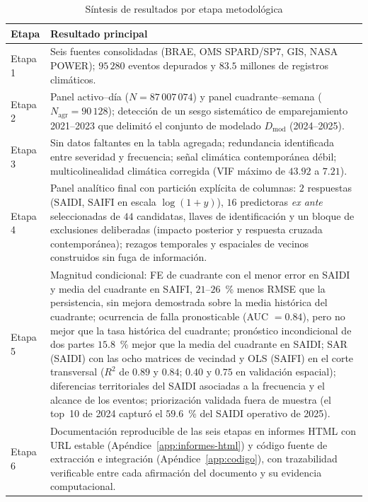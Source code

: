 \begin{table}[!htbp]
\centering
\small
\caption{Síntesis de resultados por etapa metodológica}
\label{tab:sintesis_etapas}
\begin{tabular}{p{} p{}}
\toprule
\textbf{Etapa} & \textbf{Resultado principal} \\
\midrule
Etapa 1 & Seis fuentes consolidadas (BRAE, OMS SPARD/SP7, GIS, NASA POWER); $95\,280$ eventos depurados y $83{.}5$ millones de registros climáticos. \\
Etapa 2 & Panel activo--día ($N=87\,007\,074$) y panel cuadrante--semana ($N_{\mathrm{agr}}=90\,128$); detección de un sesgo sistemático de emparejamiento 2021--2023 que delimitó el conjunto de modelado $D_{\mathrm{mod}}$ (2024--2025). \\
Etapa 3 & Sin datos faltantes en la tabla agregada; redundancia identificada entre severidad y frecuencia; señal climática contemporánea débil; multicolinealidad climática corregida (VIF máximo de $43{.}92$ a $7{.}21$). \\
Etapa 4 & Panel analítico final con partición explícita de columnas: $2$ respuestas ($\mathrm{SAIDI}$, $\mathrm{SAIFI}$ en escala $\log(1+y)$), $16$ predictoras \emph{ex ante} seleccionadas de $44$ candidatas, llaves de identificación y un bloque de exclusiones deliberadas (impacto posterior y respuesta cruzada contemporánea); rezagos temporales y espaciales de vecinos construidos sin fuga de información. \\
Etapa 5 & Magnitud condicional: FE de cuadrante con el menor error en SAIDI y media del cuadrante en SAIFI, $21$--$26$~\% menos RMSE que la persistencia, sin mejora demostrada sobre la media histórica del cuadrante; ocurrencia de falla pronosticable (AUC $=0{.}84$), pero no mejor que la tasa histórica del cuadrante; pronóstico incondicional de dos partes $15{.}8$~\% mejor que la media del cuadrante en SAIDI; SAR (SAIDI) con las ocho matrices de vecindad y OLS (SAIFI) en el corte transversal ($R^2$ de $0{.}89$ y $0{.}84$; $0{.}40$ y $0{.}75$ en validación espacial); diferencias territoriales del SAIDI asociadas a la frecuencia y el alcance de los eventos; priorización validada fuera de muestra (el top~10 de 2024 capturó el $59{.}6$~\% del SAIDI operativo de 2025). \\
Etapa 6 & Documentación reproducible de las seis etapas en informes HTML con URL estable (Apéndice~\ref{app:informes-html}) y código fuente de extracción e integración (Apéndice~\ref{app:codigo}), con trazabilidad verificable entre cada afirmación del documento y su evidencia computacional. \\
\bottomrule
\end{tabular}
\end{table}

